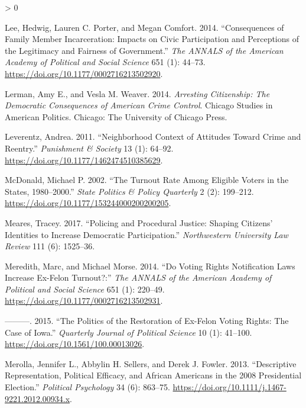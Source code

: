 \documentclass[
  12pt,
]{article}
\newlength{\cslhangindent}
\newenvironment{CSLReferences}[2] %
 {%
  \setlength{\parindent}{0pt}
  \ifodd #1 \everypar{\setlength{\hangindent}{\cslhangindent}}\ignorespaces\fi
  \ifnum #2 > 0
  \setlength{\parskip}{#2\baselineskip}
  \fi
 }%
 {}
\begin{document}
\begin{CSLReferences}{1}{0}
\leavevmode\hypertarget{ref-Lee2014}{}%
Lee, Hedwig, Lauren C. Porter, and Megan Comfort. 2014. {``Consequences of {Family Member Incarceration}: {Impacts} on {Civic Participation} and {Perceptions} of the {Legitimacy} and {Fairness} of {Government}.''} \emph{The ANNALS of the American Academy of Political and Social Science} 651 (1): 44--73. \url{https://doi.org/10.1177/0002716213502920}.

\leavevmode\hypertarget{ref-Lerman2014}{}%
Lerman, Amy E., and Vesla M. Weaver. 2014. \emph{Arresting Citizenship: The Democratic Consequences of {American} Crime Control}. Chicago Studies in {American} Politics. {Chicago}: {The University of Chicago Press}.

\leavevmode\hypertarget{ref-Leverentz2011}{}%
Leverentz, Andrea. 2011. {``Neighborhood Context of Attitudes Toward Crime and Reentry.''} \emph{Punishment \& Society} 13 (1): 64--92. \url{https://doi.org/10.1177/1462474510385629}.

\leavevmode\hypertarget{ref-McDonald2002}{}%
McDonald, Michael P. 2002. {``The {Turnout Rate} Among {Eligible Voters} in the {States}, 1980--2000.''} \emph{State Politics \& Policy Quarterly} 2 (2): 199--212. \url{https://doi.org/10.1177/153244000200200205}.

\leavevmode\hypertarget{ref-Meares2017}{}%
Meares, Tracey. 2017. {``Policing and {Procedural Justice}: {Shaping Citizens}' {Identities} to {Increase Democratic Participation}.''} \emph{Northwestern University Law Review} 111 (6): 1525--36.

\leavevmode\hypertarget{ref-Meredith2014}{}%
Meredith, Marc, and Michael Morse. 2014. {``Do {Voting Rights Notification Laws Increase Ex}-{Felon Turnout}?:''} \emph{The ANNALS of the American Academy of Political and Social Science} 651 (1): 220--49. \url{https://doi.org/10.1177/0002716213502931}.

\leavevmode\hypertarget{ref-Meredith2015}{}%
---------. 2015. {``The {Politics} of the {Restoration} of {Ex}-{Felon Voting Rights}: {The Case} of {Iowa}.''} \emph{Quarterly Journal of Political Science} 10 (1): 41--100. \url{https://doi.org/10.1561/100.00013026}.

\leavevmode\hypertarget{ref-Merolla2013}{}%
Merolla, Jennifer L., Abbylin H. Sellers, and Derek J. Fowler. 2013. {``Descriptive {Representation}, {Political Efficacy}, and {African Americans} in the 2008 {Presidential Election}.''} \emph{Political Psychology} 34 (6): 863--75. \url{https://doi.org/10.1111/j.1467-9221.2012.00934.x}.


\end{CSLReferences}
\end{document}
